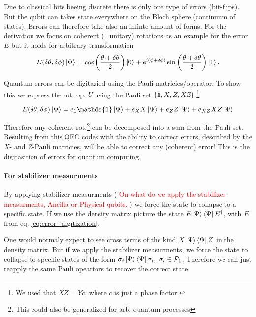 Due to classical bits beeing discrete there is only one type of errors (bit-flips). 
But the qubit can takes state everywhere on the Bloch sphere (continuum of states). 
Errors can therefore take also an infinte amount of forms.
For the derivation we focus on coherent (=unitary) rotations as an example for the error $E$ but it holds for arbitrary transformation
\begin{equation}
    E(\delta \theta, \delta \phi) \ket{\Psi}=
    \cos\left(\frac{\theta + \delta \theta}{2}\right) \ket{0} +
    e^{i(\phi + \delta \phi)} 
    \sin\left(\frac{\theta + \delta \theta}{2}\right) \ket{1}.
\end{equation} 

Quantum errors can be digitazied using the Pauli matricies/operator. 
To show this we express the rot. op. $U$ using the Pauli set
$\{\mathds{1},{X},{Z},{XZ}\}$
\footnote{We used that $XZ=Yc$, where $c$ is just a phase factor.}

\begin{equation}
    E(\delta \theta, \delta \phi)\ket{\Psi} = 
    e_1 \mathds{1} \ket{\Psi} +
    e_X X \ket{\Psi}+
    e_Z Z \ket{\Psi}+
    e_{XZ} XZ \ket{\Psi}
    \label{eq:error_digitization}
\end{equation}

Therefore any coherent rot.\footnote{
    This could also be generalized for arb. quantum processes
} can be decomposed into a sum from the Pauli set. 
Resulting from this QEC codes with the ability to correct errors, 
described by the $X$- and $Z$-Pauli matricies, 
will be able to correct any (coherent) error!
This is the digitasition of errors for quantum computing. \cite{QECintro}

\paragraph{For stabilizer measurments}
By applying stabilizer measurments (\textcolor{red}{
    On what do we apply the stabilizer measurments, Ancilla or Physical qubits.
    }) we force the state to collapse to a specific state. 
If we use the density matrix picture the state $E \ket{\Psi} \bra{\Psi} E^\dagger$, 
with $E$ from eq. \ref{eq:error_digitization}. 

One would normaly expect to see cross terms of the kind $X \ket{\Psi} \bra{\Psi} Z$ in the density matrix.
But if we apply the stabilizer measurments, we force the state to collapse to specific states of the form
$\sigma_i \ket{\Psi} \bra{\Psi} \sigma_i, \ \sigma_i \in \mathcal{P}_1$. 
Therefore we can just reapply the same Pauli opeartors to recover the correct state.

